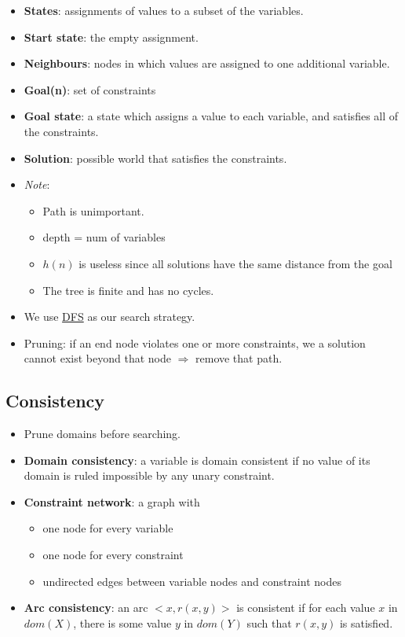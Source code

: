 \documentclass{article}
\begin{document}
\begin{itemize}
    \item \textbf{States}: assignments of values to a subset of the variables.
    \item \textbf{Start state}: the empty assignment.
    \item \textbf{Neighbours}: nodes in which values are assigned to one additional variable.
    \item \textbf{Goal(n)}: set of constraints
    \item \textbf{Goal state}: a state which assigns a value to each variable, and satisfies all of the constraints.
    \item \textbf{Solution}: possible world that satisfies the constraints.
    \item \textit{Note}: 
        \begin{itemize}
            \item Path is unimportant.
            \item depth = num of variables
            \item $h(n)$ is useless since all solutions have the same distance from the goal
            \item The tree is finite and has no cycles.
        \end{itemize}
    \item We use \underline{DFS} as our search strategy.
    \item Pruning: if an end node violates one or more constraints, we a solution cannot exist beyond that node $\Rightarrow$ remove that path.
\end{itemize}

\subsection{Consistency}

\begin{itemize}
    \item Prune domains before searching.
    \item \textbf{Domain consistency}: a variable is domain consistent if no value of its domain is ruled impossible by any unary constraint.
    \item \textbf{Constraint network}: a graph with
        \begin{itemize}
            \item one node for every variable
            \item one node for every constraint
            \item undirected edges between variable nodes and constraint nodes
        \end{itemize}
    \item \textbf{Arc consistency}: an arc $<x, r(x, y)>$ is consistent if for each value $x$ in $dom(X)$, there is some value $y$ in $dom(Y)$ such that $r(x, y)$ is satisfied.
\end{itemize}
\end{document}
